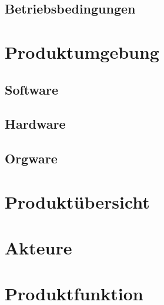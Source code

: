 \documentclass[10pt,a4paper]{article}
\begin{document}
\subsection{Betriebsbedingungen}
\section{Produktumgebung}
\subsection{Software}
\subsection{Hardware}
\subsection{Orgware}
\section{Produkt\"ubersicht}
\section{Akteure}
\section{Produktfunktion}

\end{document}
